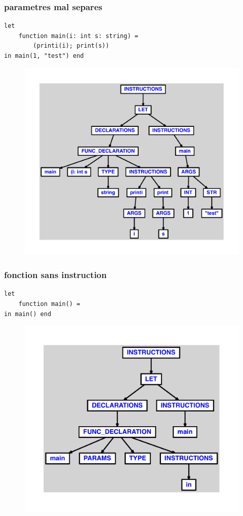 \documentclass{article}
\begin{document}
\subsubsection{parametres mal separes}
\begin{lstlisting}
let
	function main(i: int s: string) =
		(printi(i); print(s))
in main(1, "test") end
\end{lstlisting}
\newpage
\begin{figure}[H]
\centering
\includegraphics[max width=\textwidth]{ast/ast_224.pdf}
\end{figure}
\newpage
\subsubsection{fonction sans instruction}
\begin{lstlisting}
let
	function main() =
in main() end
\end{lstlisting}
\newpage
\begin{figure}[H]
\centering
\includegraphics[max width=\textwidth]{ast/ast_225.pdf}
\end{figure}
\newpage
\end{document}
